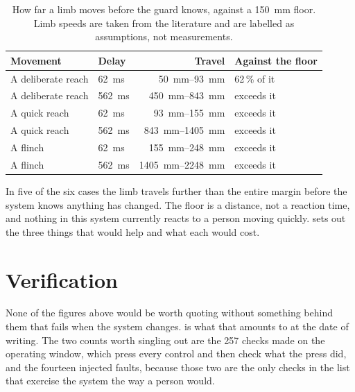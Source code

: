 \begin{table}[htbp]
  \centering
  \small
  \caption[The reaction budget]{How far a limb moves before the guard knows,
  against a \SI{150}{\milli\metre} floor. Limb speeds are taken from the
  literature and are labelled as assumptions, not measurements.}
  \label{tab:reaction}
  \begin{tabular}{@{}llrl@{}}
    \toprule
    \textbf{Movement} & \textbf{Delay} & \textbf{Travel} & \textbf{Against the floor} \\
    \midrule
    A deliberate reach & \SI{62}{\milli\second} & \SIrange{50}{93}{\milli\metre} & 62\,\% of it \\
    A deliberate reach & \SI{562}{\milli\second} & \SIrange{450}{843}{\milli\metre} & exceeds it \\
    A quick reach & \SI{62}{\milli\second} & \SIrange{93}{155}{\milli\metre} & exceeds it \\
    A quick reach & \SI{562}{\milli\second} & \SIrange{843}{1405}{\milli\metre} & exceeds it \\
    A flinch & \SI{62}{\milli\second} & \SIrange{155}{248}{\milli\metre} & exceeds it \\
    A flinch & \SI{562}{\milli\second} & \SIrange{1405}{2248}{\milli\metre} & exceeds it \\
    \bottomrule
  \end{tabular}
\end{table}

In five of the six cases the limb travels further than the entire margin
before the system knows anything has changed. The floor is a distance, not a
reaction time, and nothing in this system currently reacts to a person moving
quickly.  sets out the three things that would help and
what each would cost.

\section{Verification}

None of the figures above would be worth quoting without something behind them
that fails when the system changes.  is what that
amounts to at the date of writing. The two counts worth singling out are the
257 checks made on the operating window, which press every control and then
check what the press did, and the fourteen injected faults, because those two
are the only checks in the list that exercise the system the way a person
would.

